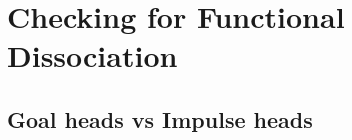 \section{Checking for Functional Dissociation}
\label{app:dissociation}

\subsection{Goal heads vs Impulse heads}

